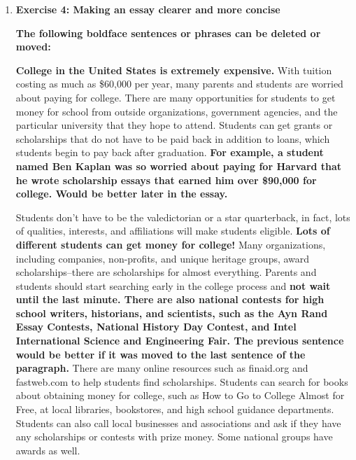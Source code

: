 \begin{enumerate}
\begin{itemize}
\begin{enumerate}
\item \textbf{Exercise 4: Making an essay clearer and more concise}

\textbf{The following boldface sentences or phrases can be deleted or moved:}

\textbf{College in the United States is extremely expensive.} With tuition costing as much as \$60,000 per year, many parents and students are worried about paying for college. There are many opportunities for students to get money for school from outside organizations, government agencies, and the particular university that they hope to attend. Students can get grants or scholarships that do not have to be paid back in addition to loans, which students begin to pay back after graduation. \textbf{For example, a student named Ben Kaplan was so worried about paying for Harvard that he wrote scholarship essays that earned him over \$90,000 for college. Would be better later in the essay.}

Students don't have to be the valedictorian or a star quarterback, in fact, lots of qualities, interests, and affiliations will make students eligible. \textbf{Lots of different students can get money for college!} Many organizations, including companies, non-profits, and unique heritage groups, award scholarships--there are scholarships for almost everything. Parents and students should start searching early in the college process and \textbf{not wait until the last minute. There are also national contests for high school writers, historians, and scientists, such as the Ayn Rand Essay Contests, National History Day Contest, and Intel International Science and Engineering Fair. The previous sentence would be better if it was moved to the last sentence of the paragraph.} There are many online resources such as finaid.org and fastweb.com to help students find scholarships. Students can search for books about obtaining money for college, such as How to Go to College Almost for Free, at local libraries, bookstores, and high school guidance departments.  Students can also call local businesses and associations and ask if they have any scholarships or contests with prize money. Some national groups have awards as well. 


\end{enumerate}
\end{itemize}
\end{enumerate}
